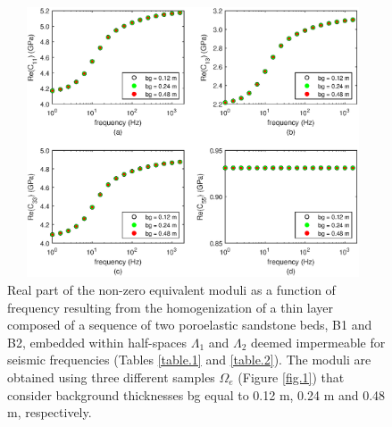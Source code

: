 \documentclass[draft]{agujournal2019}
\begin{document}
\begin{figure}[!ht]
\centering
        \includegraphics[width=110mm, height=80mm]{Figure2.eps}
\caption{Real part of the non-zero equivalent moduli as a function of frequency resulting from the homogenization of a thin layer composed of a sequence of two poroelastic sandstone beds, B1 and B2, embedded within  half-spaces $\Lambda_1$ and $\Lambda_2$ deemed impermeable for seismic frequencies (Tables \ref{table.1} and \ref{table.2}). The moduli are obtained using three different samples $\Omega_e$ (Figure \ref{fig.1}) that consider background thicknesses bg equal to 0.12 m, 0.24 m and 0.48 m, respectively.}
\label{fig.2}
\end{figure}
\end{document}
